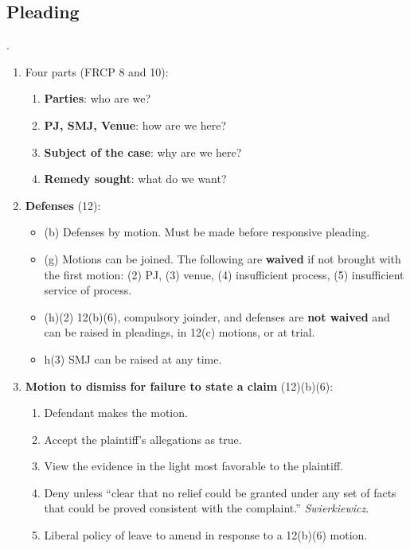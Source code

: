 \subsection{Pleading}.

\begin{enumerate}
    \item Four parts (FRCP 8 and 10):
    \begin{enumerate}
        \item \textbf{Parties}: who are we?
        \item \textbf{PJ, SMJ, Venue}: how are we here?
        \item \textbf{Subject of the case}: why are we here?
        \item \textbf{Remedy sought}: what do we want?
    \end{enumerate}    
    \item \textbf{Defenses} (12):
    \begin{itemize}
        \item (b) Defenses by motion. Must be made before responsive pleading.
        \item (g) Motions can be joined. The following are \textbf{waived} if 
        not brought with the first motion: (2) PJ, (3) venue, (4) insufficient 
        process, (5) insufficient service of process.
        \item (h)(2) 12(b)(6), compulsory joinder, and defenses are 
        \textbf{not waived} and can be raised in pleadings, in 12(c) motions, 
        or at trial.
        \item h(3) SMJ can be raised at any time.
    \end{itemize}
    \item \textbf{Motion to dismiss for failure to state a claim} (12)(b)(6):
    \begin{enumerate}
        \item Defendant makes the motion.
        \item Accept the plaintiff's allegations as true.
        \item View the evidence in the light most favorable to the plaintiff.
        \item Deny unless ``clear that no relief could be granted under any 
        set of facts that could be proved consistent with the complaint.'' 
        \emph{Swierkiewicz}.
        \item Liberal policy of leave to amend in response to a 12(b)(6) 
        motion.
    \end{enumerate}

\end{enumerate}
